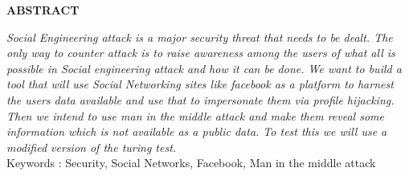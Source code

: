 \begin{center}
\thispagestyle{empty}
\vspace*{4\baselineskip}
\LARGE{\textbf{ABSTRACT}}\\[1.0cm]
\end{center}
\thispagestyle{empty}
\large{\emph{Social Engineering attack is a major security threat that needs to be
dealt. The only way to counter attack is to raise awareness among the users
of what all is possible in Social engineering attack and how it can be done.
We want to build a tool that will use Social Networking sites like facebook as
a platform to harnest the users data available and use that to impersonate
them via profile hijacking. Then we intend to use man in the middle attack
and make them reveal some information which is not available as a public
data. To test this we will use a modified version of the turing test.\\[1cm]}}
Keywords : Security, Social Networks, Facebook, Man in the middle attack